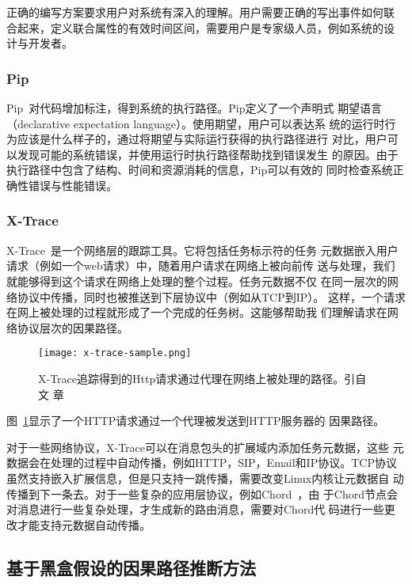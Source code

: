 正确的编写方案要求用户对系统有深入的理解。用户需要正确的写出事件如何联
合起来，定义联合属性的有效时间区间，需要用户是专家级人员，例如系统的设
计与开发者。

\subsubsection*{Pip}

Pip~\cite{pip}对代码增加标注，得到系统的执行路径。Pip定义了一个声明式
期望语言（declarative expectation language）。使用期望，用户可以表达系
统的运行时行为应该是什么样子的，通过将期望与实际运行获得的执行路径进行
对比，用户可以发现可能的系统错误，并使用运行时执行路径帮助找到错误发生
的原因。由于执行路径中包含了结构、时间和资源消耗的信息，Pip可以有效的
同时检查系统正确性错误与性能错误。


\subsubsection*{X-Trace}

X-Trace~\cite{x-trace}是一个网络层的跟踪工具。它将包括任务标示符的任务
元数据嵌入用户请求（例如一个web请求）中，随着用户请求在网络上被向前传
送与处理，我们就能够得到这个请求在网络上处理的整个过程。任务元数据不仅
在同一层次的网络协议中传播，同时也被推送到下层协议中（例如从TCP到IP）。
这样，一个请求在网上被处理的过程就形成了一个完成的任务树。这能够帮助我
们理解请求在网络协议层次的因果路径。

\begin{figure}
\centering
\begin{minipage}{0.8\linewidth}
\texttt{[image: x-trace-sample.png]}
\caption{X-Trace追踪得到的Http请求通过代理在网络上被处理的路径。引自文
章~\cite{x-trace}}
\label{fig:x-trace}
\end{minipage}
\end{figure}

图~\ref{fig:x-trace}显示了一个HTTP请求通过一个代理被发送到HTTP服务器的
因果路径。

对于一些网络协议，X-Trace可以在消息包头的扩展域内添加任务元数据，这些
元数据会在处理的过程中自动传播，例如HTTP，SIP，Email和IP协议。TCP协议
虽然支持嵌入扩展信息，但是只支持一跳传播，需要改变Linux内核让元数据自
动传播到下一条去。对于一些复杂的应用层协议，例如Chord~\cite{chord}，由
于Chord节点会对消息进行一些复杂处理，才生成新的路由消息，需要对Chord代
码进行一些更改才能支持元数据自动传播。

\subsection{基于黑盒假设的因果路径推断方法}

